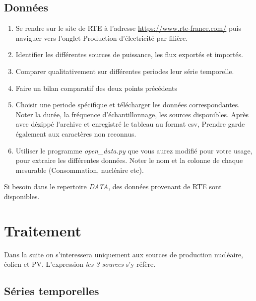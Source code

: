 \documentclass[12pt,a4]{article}
\newcommand{\tmtextit}[1]{{\itshape{#1}}}
\begin{document}
\subsection{Données}

\begin{enumerate}
  \item Se rendre sur le site de RTE à l'adresse 
  \href{https://www.rte-france.com/}{https://www.rte-france.com/} puis naviguer vers l'onglet Production d'électricité par filière.
  
  \item Identifier les différentes sources de puissance, les flux exportés et importés.
  
  \item  Comparer qualitativement sur différentes periodes leur série temporelle.
  
  \item Faire un bilan comparatif des deux points précédents
  
  \item Choisir une periode spécifique et télécharger les données
  correspondantes. Noter la durée, la fréquence d'échantillonnage, les
  sources disponibles. Après avec dézippé l'archive et enregistré le
  tableau au format csv, Prendre garde également aux caractères non
  reconnus.
  
  \item Utiliser le programme \tmtextit{open\_data.py} que vous aurez modifié
  pour votre usage, pour extraire les différentes données. Noter le nom et
  la colonne de chaque mesurable (Consommation, nucléaire etc). 
\end{enumerate}


Si besoin dans le repertoire \tmtextit{DATA}, des données provenant de RTE sont
disponibles.

\section{Traitement}

Dans la suite on s'interessera uniquement aux sources de production
nucléaire, éolien et PV. L'expression \tmtextit{les 3 sources} s'y
réfère.

\subsection{Séries temporelles}
\end{document}
